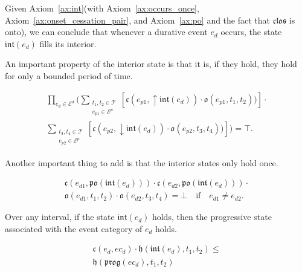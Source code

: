 Given Axiom~\ref{ax:int}(with Axiom~\ref{ax:occurs_once}, Axiom~\ref{ax:onset_cessation_pair}, and Axiom~\ref{ax:po} and the fact that $\mathfrak{clos}$ is onto), we can conclude that
whenever a durative event $e_d$ occurs, the state $\mathfrak{int}(e_d)$ fills its interior.

An important property of the interior state is that it is, if they hold, they hold for only a bounded period of time.

\begin{axiom}\label{ax:int_bounded}
	\begin{equation}
		\begin{gathered}
			\prod_{e_d \in \mathcal{E}^{d}} (\sum_{\substack{t_1, t_2 \in \mathcal{T} \\ e_{p1} \in \mathcal{E}^p}}[\mathfrak{c}(e_{p1}, \uparrow \mathfrak{int}(e_d))
			\cdot \mathfrak{o}(e_{p1}, t_1, t_2))] \cdot \\
			\sum_{\substack{t_3, t_4 \in \mathcal{T} \\ e_{p2} \in \mathcal{E}^p}}[\mathfrak{c}(e_{p2}, \downarrow \mathfrak{int}(e_d))
				\cdot \mathfrak{o}(e_{p2}, t_3, t_4))]) = \top.
		\end{gathered}
	\end{equation}
\end{axiom}

Another important thing to add is that the interior states only hold once.

\begin{axiom}\label{ax:int_once}
	\begin{equation}
		\begin{gathered}
			\mathfrak{c}(e_{d1}, \mathfrak{po}(\mathfrak{int}(e_d))) \cdot \mathfrak{c}(e_{d2}, \mathfrak{po}(\mathfrak{int}(e_d))) \cdot \\
			\mathfrak{o}(e_{d1}, t_1, t_2) \cdot \mathfrak{o}(e_{d2}, t_3, t_4) = \bot \quad \text{if} \quad e_{d1} \neq e_{d2}.
		\end{gathered}
	\end{equation}
\end{axiom}

Over any interval, if the state $\mathfrak{int}(e_d)$ holds, then the progressive state associated with the event category of $e_d$ holds.

\begin{axiom}\label{ax:int_progressive}
	\begin{equation}
		\begin{gathered}
			\mathfrak{c}(e_d, ec_d) \cdot \mathfrak{h}(\mathfrak{int}(e_d), t_1, t_2) \leq \\
			\mathfrak{h}(\mathfrak{prog}(ec_d), t_1, t_2)
		\end{gathered}
	\end{equation}
\end{axiom}

